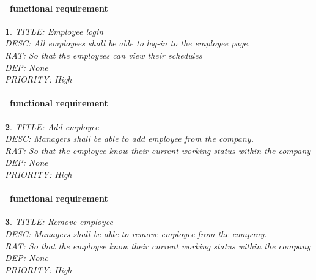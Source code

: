 \documentclass{scrreprt}
\theoremstyle{funreq}
\newtheorem{funreq}{}
\begin{document}
	\paragraph[]{\Subsectionname ~functional requirement }
	\begin{funreq}
		\label{employee_login}
		TITLE: Employee login\\
		DESC: All employees shall be able to log-in to the employee page.\\
		RAT: So that the employees can view their schedules\\
		DEP: None\\
		PRIORITY: High\\
	\end{funreq}
	
	\paragraph[]{\Subsectionname ~functional requirement }
	\begin{funreq}
		\label{employee_add}
		TITLE: Add employee\\
		DESC: Managers shall be able to add employee from the company.  \\
		RAT:  So that the employee know their current working status within the company\\
		DEP: None\\
		PRIORITY: High\\
	\end{funreq}

\paragraph[]{\Subsectionname ~functional requirement }
\begin{funreq}
	\label{employee_remove}
	TITLE: Remove employee\\
	DESC: Managers shall be able to remove employee from the company.  \\
	RAT:  So that the employee know their current working status within the company\\
	DEP: None\\
	PRIORITY: High\\
\end{funreq}
	
\end{document}
